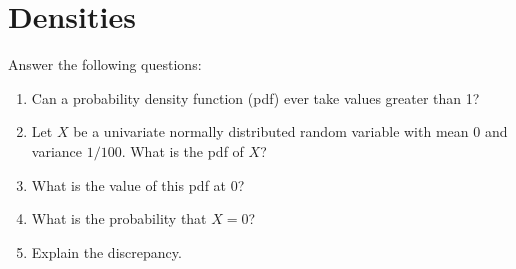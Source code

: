 \documentclass[submit]{harvardml}
\begin{document}
\newpage
\section*{Densities}
\begin{problem}
Answer the following questions:
\begin{enumerate}[label=(\alph*)]
  \item Can a probability density function (pdf) ever take values greater than 1?
  \item Let $X$ be a univariate normally distributed random variable with mean 0
        and variance $1/100$. What is the pdf of $X$?
  \item What is the value of this pdf at 0?
  \item What is the probability that $X = 0$?
  \item Explain the discrepancy.
\end{enumerate}
\end{problem}
\end{document}

